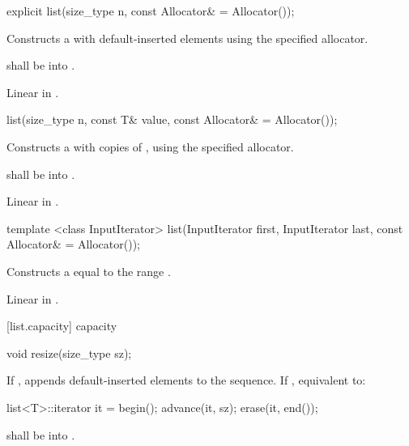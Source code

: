 %
\begin{itemdecl}
explicit list(size_type n, const Allocator& = Allocator());
\end{itemdecl}

\begin{itemdescr}
\pnum
\effects Constructs a  with
 default-inserted elements using the specified allocator.

\pnum
\requires {} shall be  into .

\pnum
\complexity
Linear in
.
\end{itemdescr}

%
\begin{itemdecl}
list(size_type n, const T& value, const Allocator& = Allocator());
\end{itemdecl}

\begin{itemdescr}
\pnum
\effects
Constructs a
with
copies of
,
using the specified allocator.

\pnum
\requires {} shall be  into .

\pnum
\complexity
Linear in
.
\end{itemdescr}

%
\begin{itemdecl}
template <class InputIterator>
  list(InputIterator first, InputIterator last, const Allocator& = Allocator());
\end{itemdecl}

\begin{itemdescr}
\pnum
\effects
Constructs a
equal to the range
.

\pnum
\complexity
Linear in
.
\end{itemdescr}

[list.capacity]{ capacity}

%
\begin{itemdecl}
void resize(size_type sz);
\end{itemdecl}

\begin{itemdescr}
\pnum
\effects
If ,
appends  default-inserted elements to the
sequence.
If , equivalent to:

\begin{codeblock}
list<T>::iterator it = begin();
advance(it, sz);
erase(it, end());
\end{codeblock}


\pnum
\requires {} shall be
 into .
\end{itemdescr}

